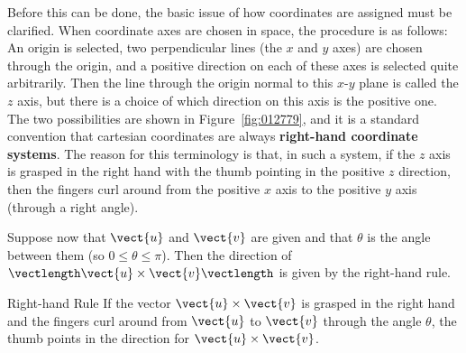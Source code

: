 Before this can be done, the basic issue of how coordinates are assigned must be clarified. When coordinate axes are chosen in space, the procedure is as follows: An origin is selected, two perpendicular lines (the $x$ and $y$ axes) are chosen through the origin, and a positive direction on each of these axes is selected quite arbitrarily. Then the line through the origin normal to this $x$-$y$ plane is called the $z$ axis, but there is a choice of which direction on this axis is the positive one. The two possibilities are shown in Figure~\ref{fig:012779}, and it is a standard convention that cartesian coordinates are always \textbf{right-hand coordinate systems}. The reason for this terminology is that, in such a system, if the $z$ axis is grasped in the right hand with the thumb pointing in the positive $z$ direction, then the fingers curl around from the positive $x$ axis to the positive $y$ axis (through a right angle).

Suppose now that $\vect{u}$ and $\vect{v}$ are given and that $\theta$ is the angle between them (so $0 \leq \theta \leq \pi$). Then the direction of $\vectlength\vect{u} \times \vect{v}\vectlength$ is given by the right-hand rule.


\begin{theorem*}[label=thm:012781]{Right-hand Rule}
If the vector $\vect{u} \times \vect{v}$ is grasped in the right hand and the fingers curl around from $\vect{u}$ to $\vect{v}$ through the angle $\theta$, the thumb points in the direction for $\vect{u} \times \vect{v}$.
\end{theorem*}

\begin{wrapfigure}[12]{l}{5cm} 
\centering

\caption{\label{fig:012789}}
\end{wrapfigure}

